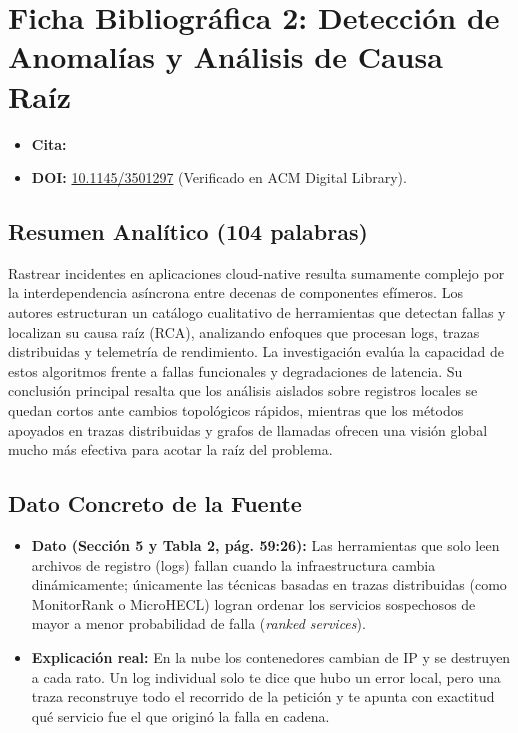 \documentclass[11pt,a4paper]{article}
\begin{document}
\newpage

\section{Ficha Bibliográfica 2: Detección de Anomalías y Análisis de Causa Raíz}

\begin{itemize}[leftmargin=1.2em]
    \item \textbf{Cita:} 
    \item \textbf{DOI:} \href{https://doi.org/10.1145/3501297}{10.1145/3501297} (Verificado en ACM Digital Library).
\end{itemize}

\subsection*{Resumen Analítico (104 palabras)}
Rastrear incidentes en aplicaciones cloud-native resulta sumamente complejo por la interdependencia asíncrona entre decenas de componentes efímeros. Los autores estructuran un catálogo cualitativo de herramientas que detectan fallas y localizan su causa raíz (RCA), analizando enfoques que procesan logs, trazas distribuidas y telemetría de rendimiento. La investigación evalúa la capacidad de estos algoritmos frente a fallas funcionales y degradaciones de latencia. Su conclusión principal resalta que los análisis aislados sobre registros locales se quedan cortos ante cambios topológicos rápidos, mientras que los métodos apoyados en trazas distribuidas y grafos de llamadas ofrecen una visión global mucho más efectiva para acotar la raíz del problema.

\subsection*{Dato Concreto de la Fuente}
\begin{itemize}[leftmargin=1.2em]
    \item \textbf{Dato (Sección 5 y Tabla 2, pág. 59:26):} Las herramientas que solo leen archivos de registro (logs) fallan cuando la infraestructura cambia dinámicamente; únicamente las técnicas basadas en trazas distribuidas (como MonitorRank o MicroHECL) logran ordenar los servicios sospechosos de mayor a menor probabilidad de falla (\emph{ranked services}).
    \item \textbf{Explicación real:} En la nube los contenedores cambian de IP y se destruyen a cada rato. Un log individual solo te dice que hubo un error local, pero una traza reconstruye todo el recorrido de la petición y te apunta con exactitud qué servicio fue el que originó la falla en cadena.
\end{itemize}
\end{document}
